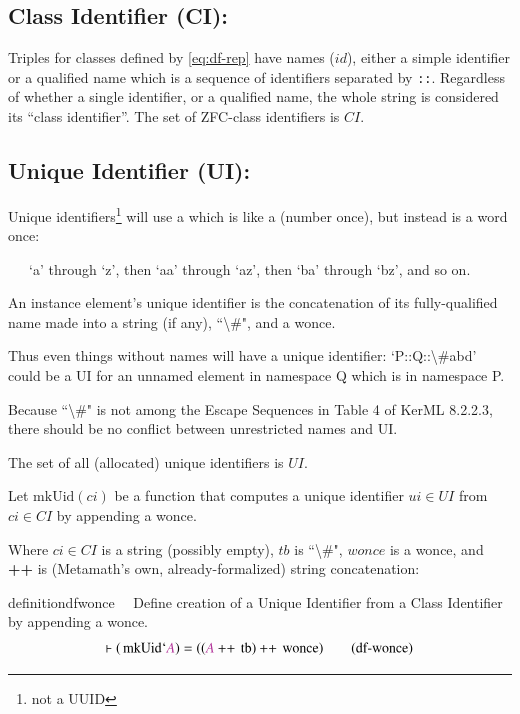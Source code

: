 \subsection{Class Identifier (CI):}

\pn Triples for classes defined by \ref{eq:df-rep} have names ($id$), either a simple identifier or a qualified name which is a sequence of identifiers separated by \texttt{::}.
Regardless of whether a single identifier, or a qualified name, the whole string is considered its ``class identifier''.
The set of ZFC-class identifiers is $CI$.

\subsection{Unique Identifier (UI):} 

\pn Unique identifiers\footnote{not a UUID} will use a  which is like a  (number once), but instead is a word once:

~~~`a' through `z', then `aa' through `az', then `ba' through `bz', and so on.

\pn An instance element's unique identifier is the concatenation of its fully-qualified name made into a string (if any), ``\textbackslash\#", and a wonce.

\pn Thus even things without names will have a unique identifier:  `P::Q::\textbackslash\#abd' could be a UI for an unnamed element in namespace Q which is in namespace P.

\pn Because ``\textbackslash\#" is not among the Escape Sequences in Table 4 of KerML 8.2.2.3, there should be no conflict between unrestricted names and UI.

\pn The set of all (allocated) unique identifiers is $UI$.

\pn Let $\mathrm{mkUid}(ci)$ be a function that computes a unique identifier $ui \in UI$ from $ci \in CI$ by appending a wonce.

\pn Where $ci \in CI$ is a string (possibly empty), $tb$ is ``\textbackslash\#", $wonce$ is a wonce, and \textbf{++} is (Metamath's own, already-formalized) string concatenation:

\begin{restatable}{definition}{dfwonce}~~ Define creation of a Unique Identifier from a Class Identifier by appending a wonce.
\begin{align}
\vdash ( \,\mathrm{mkUid} ` \mc{A} ) = ( ( \mc{A} \mathbin{\operatorname{++}} \,\mathrm{tb} ) \mathbin{\operatorname{++}} \,\mathrm{wonce} )\label{eq:df-wonce}\tag{df-wonce}
\end{align}
\end{restatable}

